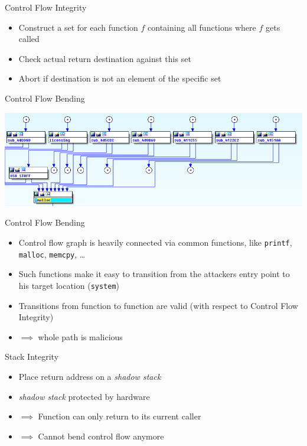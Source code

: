 \documentclass[beamer]{uibk}
\begin{document}
\begin{frame}{Control Flow Integrity}
    \begin{itemize}
        \item Construct a set for each function $f$ containing all functions
            where $f$ gets called
        \bigskip
        \item Check actual return destination against this set
        \medskip
        \item Abort if destination is not an element of the specific set
    \end{itemize}
\end{frame}

\begin{frame}{Control Flow Bending}
    \begin{center}
        \includegraphics[width=\textwidth]{gfx/unraid_part_graph_malloc.png}
    \end{center}
\end{frame}

\begin{frame}{Control Flow Bending}
    \begin{itemize}
        \item Control flow graph is heavily connected via common functions,
                like \texttt{printf}, \texttt{malloc}, \texttt{memcpy}, \dots
        \medskip
        \item Such functions make it easy to transition from the attackers
            entry point to his target location (\texttt{system})
        \medskip
        \item Transitions from function to function are valid (with respect to
            Control Flow Integrity)
        \medskip
        \item $\implies$ whole path is malicious
    \end{itemize}
\end{frame}

\begin{frame}{Stack Integrity}
    \begin{itemize}
        \item Place return address on a \textit{shadow stack}
        \medskip
        \item \textit{shadow stack} protected by hardware
        \medskip
        \item $\implies$ Function can only return to its current caller
        \medskip
        \item $\implies$ Cannot bend control flow anymore
    \end{itemize}
\end{frame}
\end{document}
